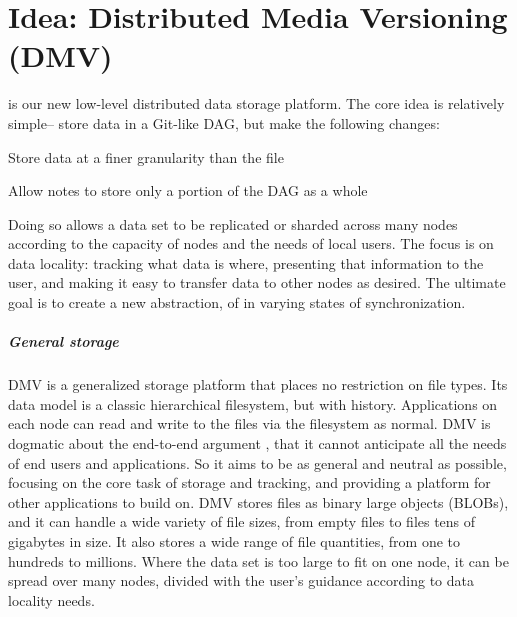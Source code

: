 \chapter{Idea: Distributed Media Versioning (DMV)}

 is our new
low-level distributed
data storage platform. The core idea is relatively simple-- store data in a
Git-like DAG, but make the following changes:

\begin{tight_enumerate}

    \item{Store data at a finer granularity than the file}

    \item{Allow notes to store only a portion of the DAG as a whole}

\end{tight_enumerate}

Doing so allows a data set to be replicated or sharded across many nodes
according to the capacity of nodes and the needs of local users. The focus is on
data locality: tracking what data is where, presenting that information to the
user, and making it easy to transfer data to other nodes as desired. The
ultimate goal is to create a new abstraction, of  in varying states of synchronization.


\paragraph{General storage}

DMV is a generalized storage platform that places no restriction on file types.
Its data model is a classic hierarchical filesystem, but with history.
Applications on each node can read and write to the files via the filesystem as
normal. DMV is dogmatic about the end-to-end argument \cite{endtoendargument},
that it cannot anticipate all the needs of end users and applications. So it
aims to be as general and neutral as possible, focusing on the core task of
storage and tracking, and providing a platform for other applications to build
on. DMV stores files as binary large objects (BLOBs), and it can handle
 a wide variety of file sizes, from empty files
to files tens of gigabytes in size.
It also stores a wide range of file quantities, from one to hundreds to
millions. Where the data set is too
large to fit on one node, it can be spread over many nodes, divided with the
user's guidance according to data locality needs.

